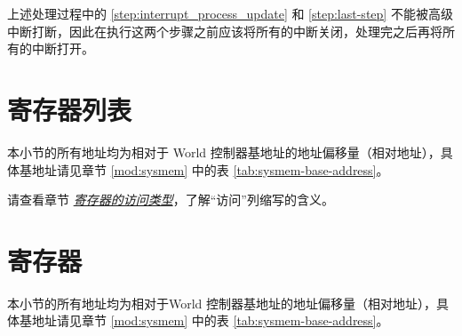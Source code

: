 \documentclass[main\_\_CN.tex]{subfiles}
\begin{document}
\begin{tiplisting}
上述处理过程中的 \ref{step:interrupt_process_update} 和 \ref{step:last-step} 不能被高级中断打断，因此在执行这两个步骤之前应该将所有的中断关闭，处理完之后再将所有的中断打开。
\end{tiplisting}









\clearpage
\section{寄存器列表}\hypertarget{wctrl-reg-summ}{}

本小节的所有地址均为相对于 World 控制器基地址的地址偏移量（相对地址），具体基地址请见章节 \ref{mod:sysmem} \textit{} 中的表 \ref{tab:sysmem-base-address}。

请查看章节 \hyperref[glossary-access-types]{\textit{寄存器的访问类型}}，了解“访问”列缩写的含义。




\clearpage
\section{寄存器}

本小节的所有地址均为相对于World 控制器基地址的地址偏移量（相对地址），具体基地址请见章节 \ref{mod:sysmem} \textit{} 中的表 \ref{tab:sysmem-base-address}。




\end{document}
